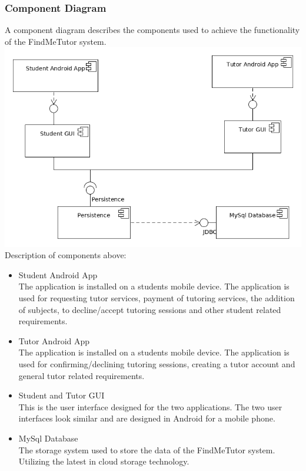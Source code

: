 \documentclass[12pt]{article}
\begin{document}
\subsubsection{Component Diagram}
A component diagram describes the components used to achieve the functionality of the FindMeTutor system.\\
\includegraphics[width=140mm]{./component_diagram/component_diagram.png}\\
Description of components above:
\begin{itemize}
\item Student Android App\\
The application is installed on a students mobile device. The application is used for requesting tutor services, payment of tutoring services, the addition of subjects, to decline/accept tutoring sessions and other student related requirements.
\item Tutor Android App\\
The application is installed on a students mobile device. The application is used for confirming/declining tutoring sessions, creating a tutor account and general tutor related requirements.
\item Student and Tutor GUI\\
This is the user interface designed for the two applications. The two user interfaces look similar and are designed in Android for a mobile phone.
\item MySql Database\\
The storage system used to store the data of the FindMeTutor system. Utilizing the latest in cloud storage technology.
\end{itemize}
\end{document}
